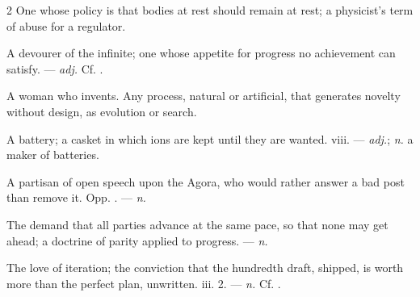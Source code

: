 \begin{multicols}{2}
 One whose policy is that bodies at rest should remain at rest; a physicist's term of abuse for a regulator.

 A devourer of the infinite; one whose appetite for progress no achievement can satisfy. —  \textit{adj.} Cf. .

  A woman who invents.   Any process, natural or artificial, that generates novelty without design, as evolution or search.

 A battery; a casket in which ions are kept until they are wanted.   viii. —  \textit{adj.};  \textit{n.} a maker of batteries.

 A partisan of open speech upon the Agora, who would rather answer a bad post than remove it. Opp. . —  \textit{n.}

 The demand that all parties advance at the same pace, so that none may get ahead; a doctrine of parity applied to progress. —  \textit{n.}

 The love of iteration; the conviction that the hundredth draft, shipped, is worth more than the perfect plan, unwritten.   iii. 2. —  \textit{n.} Cf. .

\end{multicols}

